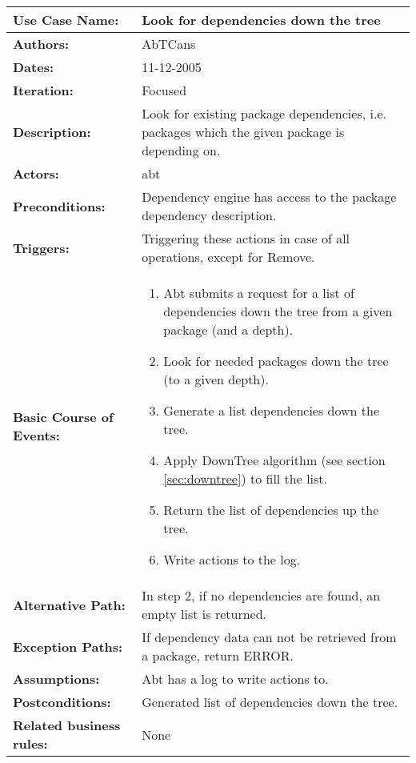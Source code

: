 \begin{tabularx}{\linewidth}{|l|X|}
\hline
\textbf{Use Case Name:} & \textbf{Look for dependencies down the tree} \\
\hline
\textbf{Authors:} & AbTCans\\
\hline
\textbf{Dates:} & 11-12-2005\\
\hline
\textbf{Iteration:} & Focused\\
\hline
\textbf{Description:} & Look for existing package dependencies, i.e. packages which the given package is depending on.\\
\hline
\textbf{Actors:} & abt \\ 
\hline
\textbf{Preconditions:} & Dependency engine has access to the package dependency description.\\
\hline
\textbf{Triggers:} & Triggering these actions in case of all operations, except for Remove.\\
\hline
\textbf{Basic Course of Events:} & 
\begin{minipage}{\linewidth} 
  \vspace{0.05em}
  \begin{enumerate}
   \item Abt submits a request for a list of dependencies down the tree from a given package (and a depth).
   \item Look for needed packages down the tree (to a given depth).
   \item Generate a list dependencies down the tree.
   \item Apply DownTree algorithm (see section \ref{sec:downtree}) to fill the list.
   \item Return the list of dependencies up the tree.
   \item Write actions to the log.
  \end{enumerate}
  \vspace{0.05em}
\end{minipage}
\\
\hline 
\textbf{Alternative Path:} & In step 2, if no dependencies are found, an empty list is returned.\\
\hline
\textbf{Exception Paths:} & If dependency data can not be retrieved from a package, return ERROR. \\
\hline
\textbf{Assumptions:} & Abt has a log to write actions to. \\
\hline
\textbf{Postconditions:} & Generated list of dependencies down the tree.\\
\hline
\textbf{Related business rules:} & None\\
\hline
\end{tabularx}


 